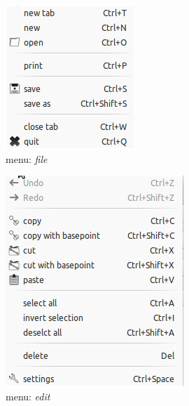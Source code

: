 \documentclass[a4paper,11pt]{report}
\begin{document}
\begin{minipage}[b]{\textwidth/2}
\begin{figure}[H]
\begin{center}
\includegraphics[scale=0.6]{../pictures/filemenu.png}
\caption{menu: \textit{file}}
\label{pic:filemenu}
\end{center}
\end{figure}
\end{minipage}
\begin{minipage}[b]{\textwidth/2}
\begin{figure}[H]
\begin{center}
\includegraphics[scale=0.6]{../pictures/editmenu.png}
\caption{menu: \textit{edit}}
\label{pic:editmenu}
\end{center}
\end{figure}
\end{minipage}
\end{document}
